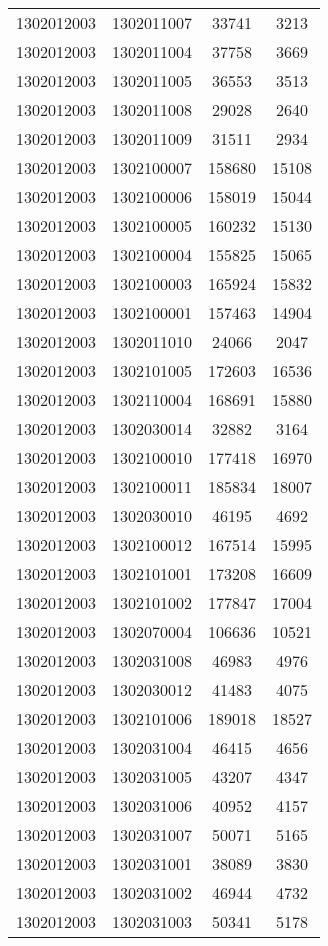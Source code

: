 \begin{longtable}{llcc}
1302012003 & 1302011007 & 33741 & 3213\\
1302012003 & 1302011004 & 37758 & 3669\\
1302012003 & 1302011005 & 36553 & 3513\\
1302012003 & 1302011008 & 29028 & 2640\\
1302012003 & 1302011009 & 31511 & 2934\\
1302012003 & 1302100007 & 158680 & 15108\\
1302012003 & 1302100006 & 158019 & 15044\\
1302012003 & 1302100005 & 160232 & 15130\\
1302012003 & 1302100004 & 155825 & 15065\\
1302012003 & 1302100003 & 165924 & 15832\\
1302012003 & 1302100001 & 157463 & 14904\\
1302012003 & 1302011010 & 24066 & 2047\\
1302012003 & 1302101005 & 172603 & 16536\\
1302012003 & 1302110004 & 168691 & 15880\\
1302012003 & 1302030014 & 32882 & 3164\\
1302012003 & 1302100010 & 177418 & 16970\\
1302012003 & 1302100011 & 185834 & 18007\\
1302012003 & 1302030010 & 46195 & 4692\\
1302012003 & 1302100012 & 167514 & 15995\\
1302012003 & 1302101001 & 173208 & 16609\\
1302012003 & 1302101002 & 177847 & 17004\\
1302012003 & 1302070004 & 106636 & 10521\\
1302012003 & 1302031008 & 46983 & 4976\\
1302012003 & 1302030012 & 41483 & 4075\\
1302012003 & 1302101006 & 189018 & 18527\\
1302012003 & 1302031004 & 46415 & 4656\\
1302012003 & 1302031005 & 43207 & 4347\\
1302012003 & 1302031006 & 40952 & 4157\\
1302012003 & 1302031007 & 50071 & 5165\\
1302012003 & 1302031001 & 38089 & 3830\\
1302012003 & 1302031002 & 46944 & 4732\\
1302012003 & 1302031003 & 50341 & 5178\\

\end{longtable}
